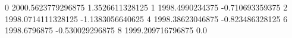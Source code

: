 0 2000.5623779296875 1.3526611328125
1 1998.4990234375 -0.710693359375
2 1998.0714111328125 -1.1383056640625
4 1998.38623046875 -0.823486328125
6 1998.6796875 -0.530029296875
8 1999.209716796875 0.0
